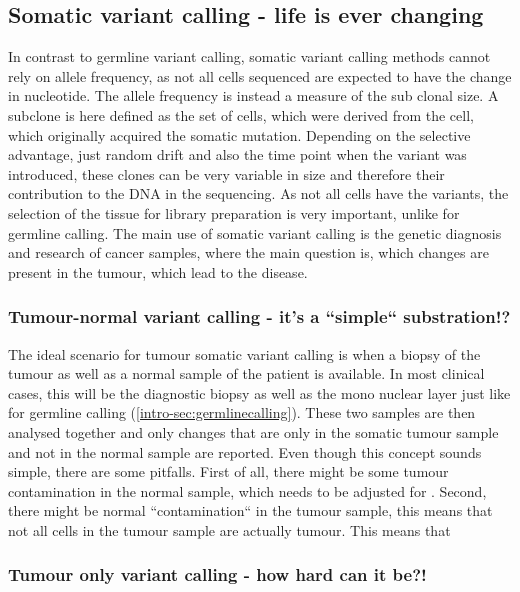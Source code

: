 \subsection[Somatic]{Somatic variant calling - life is ever changing}
\label{intro-sec:somaticcalling}
In contrast to germline variant calling, somatic variant calling methods cannot rely on allele frequency, as not all cells sequenced are expected to have the change in nucleotide. The allele frequency is instead a measure of the sub clonal size. A subclone is here defined as the set of cells, which were derived from the cell, which originally acquired the somatic mutation. Depending on the selective advantage, just random drift and also the time point when the variant was introduced, these clones can be very variable in size and therefore their contribution to the DNA in the sequencing.
As not all cells have the variants, the selection of the tissue for library preparation is very important, unlike for germline calling. 
The main use of somatic variant calling is the genetic diagnosis and research of cancer samples, where the main question is, which changes are present in the tumour, which lead to the disease.

\subsubsection[Tumour-normal]{Tumour-normal variant calling - it's a ``simple`` substration!?}
\label{intro-sec:tncalling}
The ideal scenario for tumour somatic variant calling is when a biopsy of the tumour as well as a normal sample of the patient is available. In most clinical cases, this will be the diagnostic biopsy as well as the mono nuclear layer just like for germline calling (\autoref{intro-sec:germlinecalling}). 
These two samples are then analysed together and only changes that are only in the somatic tumour sample and not in the normal sample are reported. Even though this concept sounds simple, there are some pitfalls. First of all, there might be some tumour contamination in the normal sample, which needs to be adjusted for \cite{Kim2018,TaylorWeiner2018}. Second, there might be normal ``contamination`` in the tumour sample, this means that not all cells in the tumour sample are actually tumour. This means that

\subsubsection[Tumour only]{Tumour only variant calling - how hard can it be?!}
\label{intro-sec:tocalling}


